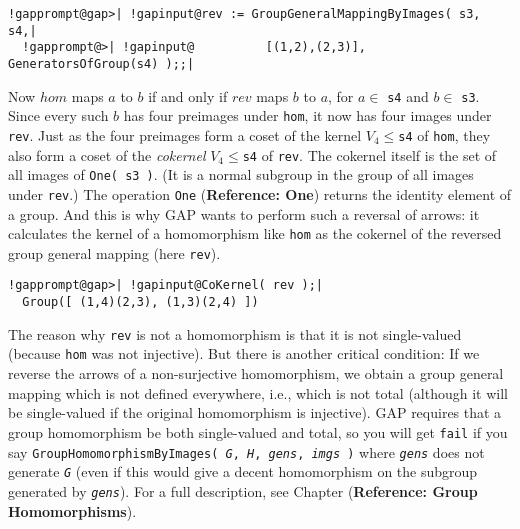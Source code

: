 \documentclass[a4paper,11pt]{report}
\begin{document}
{{ 
\begin{Verbatim}[commandchars=!@|,fontsize=\small,frame=single,label=Example]
  !gapprompt@gap>| !gapinput@rev := GroupGeneralMappingByImages( s3, s4,|
  !gapprompt@>| !gapinput@          [(1,2),(2,3)], GeneratorsOfGroup(s4) );;|
\end{Verbatim}
 

 Now $hom$ maps $a$ to $b$ if and only if $rev$ maps $b$ to $a$, for $a \in$ \texttt{s4} and $b \in$ \texttt{s3}. Since every such $b$ has four preimages under \texttt{hom}, it now has four images under \texttt{rev}. Just as the four preimages form a coset of the kernel $V_4 \leq $\texttt{s4} of \texttt{hom}, they also form a coset of the \emph{cokernel} $V_4 \leq $\texttt{s4} of \texttt{rev}. The cokernel itself is the set of all images of \texttt{One( s3 )}. (It is a normal subgroup in the group of all images under \texttt{rev}.) The operation \texttt{One} (\textbf{Reference: One}) returns the identity element of a group. And this is why \textsf{GAP} wants to perform such a reversal of arrows: it calculates the kernel of a
homomorphism like \texttt{hom} as the cokernel of the reversed group general mapping (here \texttt{rev}). 

 
\begin{Verbatim}[commandchars=!@|,fontsize=\small,frame=single,label=Example]
  !gapprompt@gap>| !gapinput@CoKernel( rev );|
  Group([ (1,4)(2,3), (1,3)(2,4) ])
\end{Verbatim}
 

   The reason why \texttt{rev} is not a homomorphism is that it is not single-valued (because \texttt{hom} was not injective). But there is another critical condition: If we reverse the
arrows of a non-surjective homomorphism, we obtain a group general mapping
which is not defined everywhere, i.e., which is not total (although it will be
single-valued if the original homomorphism is injective). \textsf{GAP} requires that a group homomorphism be both single-valued and total, so you
will get \texttt{fail} if you say \texttt{GroupHomomorphismByImages( \mbox{\texttt{\mdseries\slshape G}}, \mbox{\texttt{\mdseries\slshape H}}, \mbox{\texttt{\mdseries\slshape gens}}, \mbox{\texttt{\mdseries\slshape imgs}} )} where \mbox{\texttt{\mdseries\slshape gens}} does not generate \mbox{\texttt{\mdseries\slshape G}} (even if this would give a decent homomorphism on the subgroup generated by \mbox{\texttt{\mdseries\slshape gens}}). For a full description, see Chapter  (\textbf{Reference: Group Homomorphisms}). 

}}
\end{document}
